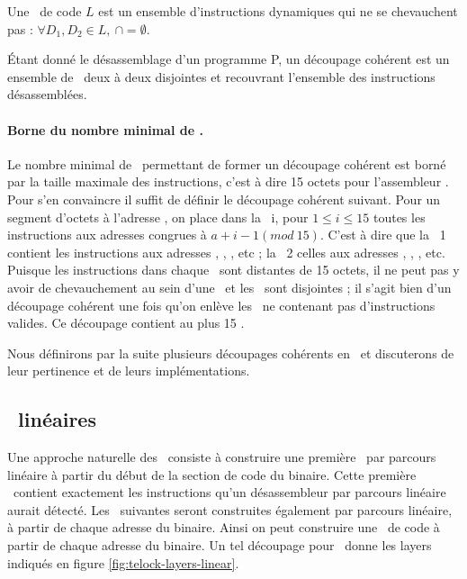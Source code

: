\begin{defi}
 Une \layer\ de code $L$ est un ensemble d'instructions dynamiques qui ne se chevauchent pas : $\forall D_1, D_2\in L,\ $$\cap$$=\emptyset$.
\label{def:layer}
\end{defi}

\begin{defi}
 Étant donné le désassemblage d'un programme P, un découpage cohérent est un ensemble de \layers\ deux à deux disjointes et recouvrant l'ensemble des instructions désassemblées.
\label{def:decoupage}
\end{defi}

\paragraph{Borne du nombre minimal de \layers.}
Le nombre minimal de \layers\ permettant de former un découpage cohérent est borné par la taille maximale des instructions, c'est à dire 15 octets pour l'assembleur \xq.
Pour s'en convaincre il suffit de définir le découpage cohérent suivant. Pour un segment d'octets à l'adresse , on place dans la \layer\ i, pour $1\leq i\leq 15$ toutes les instructions aux adresses congrues à $a+i-1 (mod\ 15)$. C'est à dire que la \layer\ 1 contient les instructions aux adresses , , , etc ; la \layer\ 2 celles aux adresses , , , etc. Puisque les instructions dans chaque \layer\ sont distantes de 15 octets, il ne peut pas y avoir de chevauchement au sein d'une \layer\ et les \layers\ sont disjointes ; il s'agit bien d'un découpage cohérent une fois qu'on enlève les \layers\ ne contenant pas d'instructions valides. Ce découpage contient au plus 15 \layers.

Nous définirons par la suite plusieurs découpages cohérents en \layers\ et discuterons de leur pertinence et de leurs implémentations.


\subsection{\Layers\ linéaires}
Une approche naturelle des \layers\ consiste à construire une première \layer\ par parcours linéaire à partir du début de la section de code du binaire.
Cette première \layer\ contient exactement les instructions qu'un désassembleur par parcours linéaire aurait détecté.
Les \layers\ suivantes seront construites également par parcours linéaire, à partir de chaque adresse du binaire.
Ainsi on peut construire une \layer\ de code à partir de chaque adresse du binaire.
Un tel découpage pour \telock\ donne les layers indiqués en figure \ref{fig:telock-layers-linear}.

